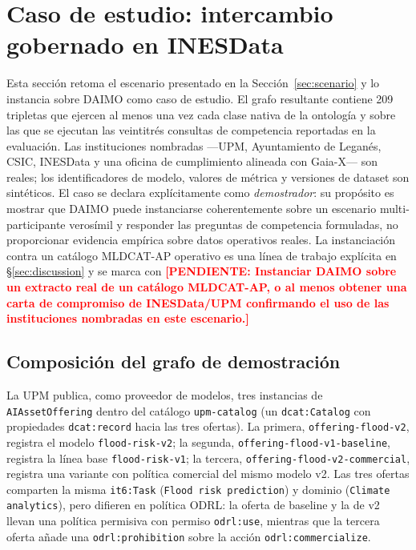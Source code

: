 \documentclass[11pt,a4paper]{article}
\newcommand{\code}[1]{\texttt{#1}}
\newcommand{\TODO}[1]{\textcolor{red}{\textbf{[PENDIENTE: #1]}}}
\begin{document}
\section{Caso de estudio: intercambio gobernado en INESData}\label{sec:demo}

Esta sección retoma el escenario presentado en la Sección~\ref{sec:scenario} y lo instancia sobre DAIMO como caso de estudio. El grafo resultante contiene 209 tripletas que ejercen al menos una vez cada clase nativa de la ontología y sobre las que se ejecutan las veintitrés consultas de competencia reportadas en la evaluación. Las instituciones nombradas ---UPM, Ayuntamiento de Leganés, CSIC, INESData y una oficina de cumplimiento alineada con Gaia-X--- son reales; los identificadores de modelo, valores de métrica y versiones de dataset son sintéticos. El caso se declara explícitamente como \emph{demostrador}: su propósito es mostrar que DAIMO puede instanciarse coherentemente sobre un escenario multi-participante verosímil y responder las preguntas de competencia formuladas, no proporcionar evidencia empírica sobre datos operativos reales. La instanciación contra un catálogo MLDCAT-AP operativo es una línea de trabajo explícita en §\ref{sec:discussion} y se marca con \TODO{Instanciar DAIMO sobre un extracto real de un catálogo MLDCAT-AP, o al menos obtener una carta de compromiso de INESData/UPM confirmando el uso de las instituciones nombradas en este escenario.}

\subsection{Composición del grafo de demostración}

La UPM publica, como proveedor de modelos, tres instancias de \code{AIAssetOffering} dentro del catálogo \texttt{upm-catalog} (un \code{dcat:Catalog} con propiedades \code{dcat:record} hacia las tres ofertas). La primera, \texttt{offering-flood-v2}, registra el modelo \texttt{flood-risk-v2}; la segunda, \texttt{offering-flood-v1-baseline}, registra la línea base \texttt{flood-risk-v1}; la tercera, \texttt{offering-flood-v2-commercial}, registra una variante con política comercial del mismo modelo v2. Las tres ofertas comparten la misma \code{it6:Task} (\texttt{Flood risk prediction}) y dominio (\texttt{Climate analytics}), pero difieren en política ODRL: la oferta de baseline y la de v2 llevan una política permisiva con permiso \code{odrl:use}, mientras que la tercera oferta añade una \code{odrl:prohibition} sobre la acción \code{odrl:commercialize}.
\end{document}

